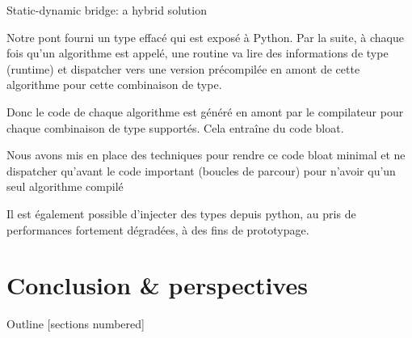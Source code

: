 \documentclass[12pt,aspectratio=169]{beamer}
\begin{document}
\begin{frame}{Static-dynamic bridge: a hybrid solution}
{    Notre pont fourni un type effacé qui est exposé à Python. Par la suite, à chaque fois qu'un algorithme est appelé, une routine va lire des informations de type (runtime) et dispatcher vers une version précompilée en amont de cette algorithme pour cette combinaison de type.
    
    Donc le code de chaque algorithme est généré en amont par le compilateur pour chaque combinaison de type supportés. Cela entraîne du code bloat.
    
    Nous avons mis en place des techniques pour rendre ce code bloat minimal et ne dispatcher qu'avant le code important (boucles de parcour) pour n'avoir qu'un seul algorithme compilé
    
    Il est également possible d'injecter des types depuis python, au pris de performances fortement dégradées, à des fins de prototypage.
  }
\end{frame}

%
%
%

\section[Conclusion \& perspectives]{Conclusion \& perspectives}

\begin{frame}{Outline}
  [sections numbered]
  \vspace{0.2cm}
  \small%
  \tableofcontents[currentsection]
  \pdfcomment[icon=Note]{   }
\end{frame}
\end{document}
